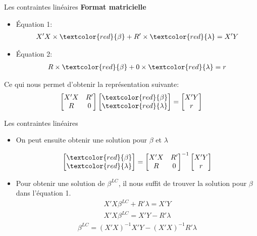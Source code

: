 \documentclass{beamer}
\begin{document}
\begin{frame}{Les contraintes linéaires}
\textbf{Format matricielle}
\begin{itemize}
\item Équation 1:
\begin{align*}
X'X \times \textcolor{red}{\beta} + R' \times \textcolor{red}{\lambda} = X'Y
\end{align*}
\item Équation 2:
\begin{align*}
R \times \textcolor{red}{\beta} + 0 \times \textcolor{red}{\lambda} = r
\end{align*}
\end{itemize}
Ce qui nous permet d'obtenir la représentation suivante:
\begin{align*}
\begin{bmatrix}
X'X & R' \\
R & 0 
\end{bmatrix}
\begin{bmatrix}
\textcolor{red}{\beta} \\
\textcolor{red}{\lambda}
\end{bmatrix}
=
\begin{bmatrix}
X'Y \\
r
\end{bmatrix}
\end{align*}
\end{frame}


\begin{frame}{Les contraintes linéaires}

\begin{itemize}
\item On peut ensuite obtenir une solution pour $\beta$ et $\lambda$

\begin{align*}
\begin{bmatrix}
\textcolor{red}{\beta} \\
\textcolor{red}{\lambda}
\end{bmatrix}
=
\begin{bmatrix}
X'X & R' \\
R & 0 
\end{bmatrix}^{-1}
\begin{bmatrix}
X'Y \\
r
\end{bmatrix}
\end{align*}

\item Pour obtenir une solution de $\beta^{LC}$, il nous suffit de trouver la solution pour $\beta$ dans l'équation 1.
\begin{align*}
X'X  \beta^{LC} + R' \lambda = X'Y
\end{align*}
\begin{align*}
X'X  \beta^{LC}  = X'Y-R' \lambda
\end{align*}
\begin{align*}
\beta^{LC}  = (X'X)^{-1}X'Y-(X'X)^{-1}R' \lambda
\end{align*}
\end{itemize}
\end{frame}
\end{document}
